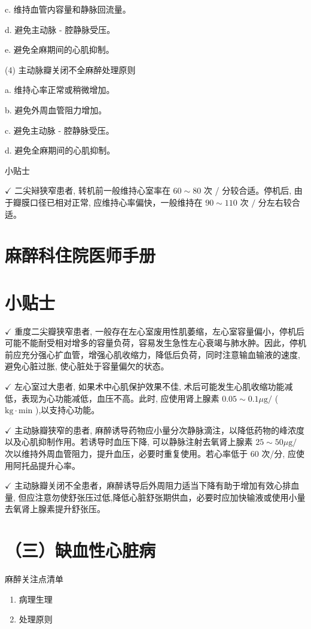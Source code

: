 \documentclass[10pt]{article}
\begin{document}
c. 维持血管内容量和静脉回流量。

d. 避免主动脉 - 腔静脉受压。

e. 避免全麻期间的心肌抑制。

(4) 主动脉瓣关闭不全麻醉处理原则

a. 维持心率正常或稍微增加。

b. 避免外周血管阻力增加。

c. 避免主动脉 - 腔静脉受压。

d. 避免全麻期间的心肌抑制。

小贴士

$\checkmark$ 二尖㦚狭窄患者, 转机前一般维持心室率在 $60 \sim 80$ 次 / 分较合适。停机后, 由于瓣膜口径已相对正常, 应维持心率偏快，一般维持在 $90 \sim 110$ 次 $/$ 分左右较合适。

\section*{麻醉科住院医师手册}
\section*{小贴士}
$\checkmark$ 重度二尖瓣狭窄患者, 一般存在左心室废用性肌萎缩，左心室容量偏小，停机后可能不能耐受相对增多的容量负荷，容易发生急性左心衰竭与肺水肿。因此，停机前应充分强心扩血管，增强心肌收缩力，降低后负荷，同时注意输血输液的速度, 避免心脏过胀, 使心脏处于容量偏欠的状态。

$\checkmark$ 左心室过大患者, 如果术中心肌保护效果不佳, 术后可能发生心肌收缩功能减低，表现为心功能减低，血压不高。此时, 应使用肾上腺素 $0.05 \sim 0.1 \mu \mathrm{g} /$ ( $\mathrm{kg} \cdot \mathrm{min}$ ),以支持心功能。

$\checkmark$ 主动脉瓣狭窄的患者, 麻醉诱导药物应小量分次静脉滴注，以降低药物的峰浓度以及心肌抑制作用。若诱导时血压下降, 可以静脉注射去氧肾上腺素 $25 \sim 50 \mu \mathrm{g} /$ 次以维持外周血管阻力，提升血压，必要时重复使用。若心率低于 60 次/分, 应使用阿托品提升心率。

$\checkmark$ 主动脉瓣关闭不全患者，麻醉诱导后外周阻力适当下降有助于增加有效心排血量, 但应注意勿使舒张压过低,降低心脏舒张期供血，必要时应加快输液或使用小量去氧肾上腺素提升舒张压。

\section*{（三）缺血性心脏病}
麻醉关注点清单

\begin{enumerate}
  \item 病理生理

  \item 处理原则

\end{enumerate}
\end{document}
